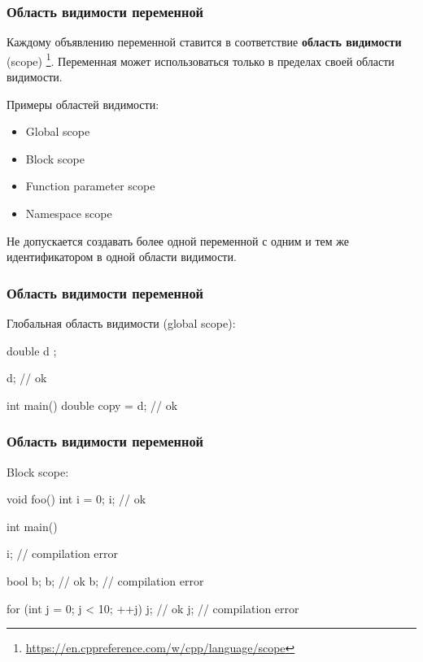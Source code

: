 \documentclass[compress, 8pt]{beamer}
\begin{document}
\begin{frame}[fragile]

    \frametitle{Область видимости переменной}

    Каждому объявлению переменной ставится в соответствие
    \textbf{область видимости} (scope)
    \footnote{\url{https://en.cppreference.com/w/cpp/language/scope}}.
    Переменная может использоваться только в пределах своей области
    видимости.

    \hfill \break
    Примеры областей видимости:

    \begin{itemize}
        \item Global scope
        \item Block scope
        \item Function parameter scope
        \item Namespace scope
    \end{itemize}

    \hfill \break
    Не допускается создавать более одной переменной с одним и тем же
    идентификатором в одной области видимости.


\end{frame}

\begin{frame}[fragile]

    \frametitle{Область видимости переменной}

    Глобальная область видимости (global scope):

    \begin{myinplacelisting}[minted language=cpp]
double d {};

d; // ok

int main() {
    double copy = d; // ok
}
    \end{myinplacelisting}

\end{frame}

\begin{frame}[fragile]

    \frametitle{Область видимости переменной}

    Block scope:

    \begin{myinplacelisting}[minted language=cpp]
void foo() {
    int i = 0;
    i; // ok
}

int main() {
    i; // compilation error

    {
        bool b;
        b; // ok
    }
    b; // compilation error

    for (int j = 0; j < 10; ++j) {
        j; // ok
    }
    j; // compilation error
}
    \end{myinplacelisting}

\end{frame}
\end{document}
